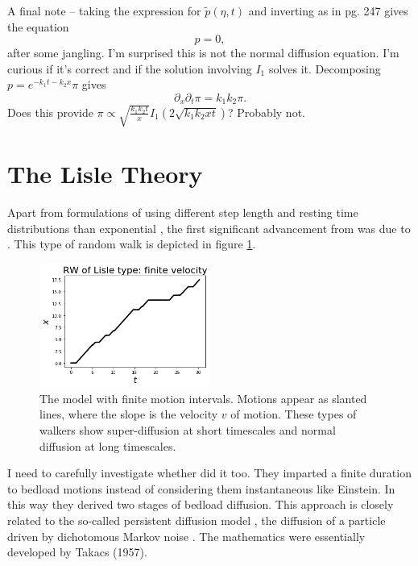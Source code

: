 \documentclass[11pt]{article}
\newcommand\be{\begin{equation}} %
\newcommand\ee{\end{equation}}   %
\begin{document}
A final note -- taking the expression for $\tilde{p}(\eta,t)$ and inverting as in \citet{Weiss1994} pg. 247 gives the equation 
\be [k_1 \partial_x + k_2\partial_t + \partial_x \partial_t] p = 0, \ee
after some jangling.
I'm surprised this is not the normal diffusion equation.
I'm curious if it's correct and if the solution involving $I_1$ solves it.
Decomposing $p = e^{-k_1 t - k_2 x}\pi$ gives 
\be \partial_x \partial_t \pi = k_1 k_2\pi.\ee
Does this provide $\pi \propto \sqrt{\frac{k_1k_2t}{x}}I_1(2\sqrt{k_1k_2xt})$?
Probably not.

\section{The Lisle Theory}
Apart from formulations of \citet{Einstein1937} using different step length and resting time distributions than exponential \citep[e.g.][]{Sayre1965}, the first significant advancement from \citet{Einstein1937} was due to \citet{Lisle1998}.
This type of random walk is depicted in figure \ref{fig:lislewalk}.
\begin{figure}
	\centering
	\includegraphics[width=0.5\textwidth,keepaspectratio]{lisle_rw.png}
	\caption{The \citet{Lisle1998} model with finite motion intervals. Motions appear as slanted lines, where the slope is the velocity $v$ of motion. These types of walkers show super-diffusion at short timescales and normal diffusion at long timescales.}
	\label{fig:lislewalk}
\end{figure}
I need to carefully investigate whether \citet{Gordon1972} did it too.
They imparted a finite duration to bedload motions instead of considering them instantaneous like Einstein. In this way they derived two stages of bedload diffusion.
This approach is closely related to the so-called persistent diffusion model \citep{Balakrishnan1988,VanDenBroeck1990}, the diffusion of a particle driven by dichotomous Markov noise \citep[e.g.][]{Horsthemke1984,Risken1989,Bena2006}. 
The mathematics were essentially developed by Takacs (1957).
\end{document}
